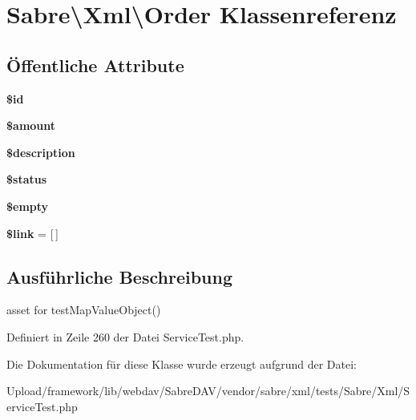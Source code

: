 \hypertarget{class_sabre_1_1_xml_1_1_order}{}\section{Sabre\textbackslash{}Xml\textbackslash{}Order Klassenreferenz}
\label{class_sabre_1_1_xml_1_1_order}
\subsection*{Öffentliche Attribute}
\begin{DoxyCompactItemize}
\item 
\mbox{\label{class_sabre_1_1_xml_1_1_order_ab427427b642a3b5b8ba5ffa255599aa5}} 
{\bfseries \$id}
\item 
\mbox{\label{class_sabre_1_1_xml_1_1_order_ae815bcd6d85e010596145f972203be4d}} 
{\bfseries \$amount}
\item 
\mbox{\label{class_sabre_1_1_xml_1_1_order_a43d14fa5c67fb59e46b8ee97da69c662}} 
{\bfseries \$description}
\item 
\mbox{\label{class_sabre_1_1_xml_1_1_order_a0e4af3c00d44f58a7bad2390a1706976}} 
{\bfseries \$status}
\item 
\mbox{\label{class_sabre_1_1_xml_1_1_order_a2c32560daf582ad76f14a2abd361e16f}} 
{\bfseries \$empty}
\item 
\mbox{\label{class_sabre_1_1_xml_1_1_order_a168215d572ff363d979fe97e18eebb85}} 
{\bfseries \$link} = \mbox{[}$\,$\mbox{]}
\end{DoxyCompactItemize}


\subsection{Ausführliche Beschreibung}
asset for test\+Map\+Value\+Object() 

Definiert in Zeile 260 der Datei Service\+Test.\+php.



Die Dokumentation für diese Klasse wurde erzeugt aufgrund der Datei\+:\begin{DoxyCompactItemize}
\item 
Upload/framework/lib/webdav/\+Sabre\+D\+A\+V/vendor/sabre/xml/tests/\+Sabre/\+Xml/Service\+Test.\+php\end{DoxyCompactItemize}
